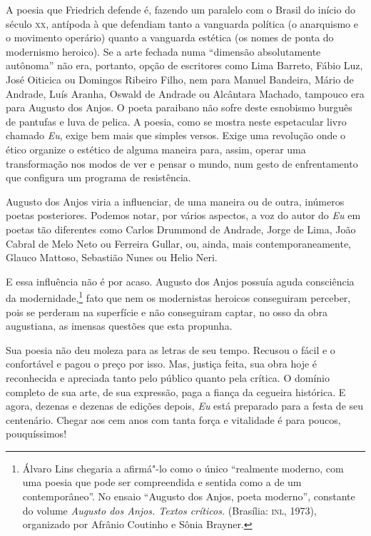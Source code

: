 A poesia que Friedrich defende é, fazendo um paralelo com o Brasil
do início do século \textsc{xx}, antípoda à que defendiam tanto a vanguarda
política (o anarquismo e o movimento operário) quanto a vanguarda
estética (os nomes de ponta do modernismo heroico). Se a arte fechada
numa “dimensão absolutamente autônoma” não era, portanto, opção de
escritores como Lima Barreto, Fábio Luz, José Oiticica ou Domingos
Ribeiro Filho, nem para Manuel Bandeira, Mário de Andrade, Luís Aranha,
Oswald de Andrade ou Alcântara Machado, tampouco era para Augusto dos
Anjos. O poeta paraibano não sofre deste esnobismo burguês de pantufas
e luva de pelica. A poesia, como se mostra neste espetacular livro
chamado \textit{Eu}, exige bem mais que simples versos. Exige uma
revolução onde o ético organize o estético de alguma maneira para,
assim, operar uma transformação nos modos de ver e pensar o mundo, num
gesto de enfrentamento que configura um programa de resistência.

\asterisc

Augusto dos Anjos viria a influenciar, de uma maneira ou de outra,
inúmeros poetas posteriores. Podemos notar, por vários aspectos, a voz
do autor do \textit{Eu} em poetas tão diferentes como Carlos Drummond
de Andrade, Jorge de Lima, João Cabral de Melo Neto ou Ferreira Gullar,
ou, ainda, mais contemporaneamente, Glauco Mattoso, Sebastião Nunes ou
Helio Neri.

E essa influência não é por acaso. Augusto dos Anjos possuía 
aguda consciência da modernidade,\footnote{ Álvaro Lins chegaria a
afirmá"-lo como o único “realmente moderno, com uma poesia que pode ser
compreendida e sentida como a de um contemporâneo”. No ensaio “Augusto
dos Anjos, poeta moderno”, constante do volume \textit{Augusto dos
Anjos. Textos críticos.} (Brasília: \textsc{inl}, 1973), organizado por Afrânio
Coutinho e Sônia Brayner.} fato que nem os modernistas heroicos
conseguiram perceber, pois se perderam na superfície e não conseguiram
captar, no osso da obra augustiana, as imensas questões que esta
propunha. 

Sua poesia não deu moleza para as letras de seu tempo. Recusou o
fácil e o confortável e pagou o preço por isso. Mas, justiça feita, sua
obra hoje é reconhecida e apreciada tanto pelo público quanto pela
crítica. O domínio completo de sua arte, de sua expressão, paga a
fiança da cegueira histórica. E agora, dezenas e dezenas de edições
depois, \textit{Eu} está preparado para a festa de seu centenário.
Chegar aos cem anos com tanta força e vitalidade é para poucos,
pouquíssimos! 

